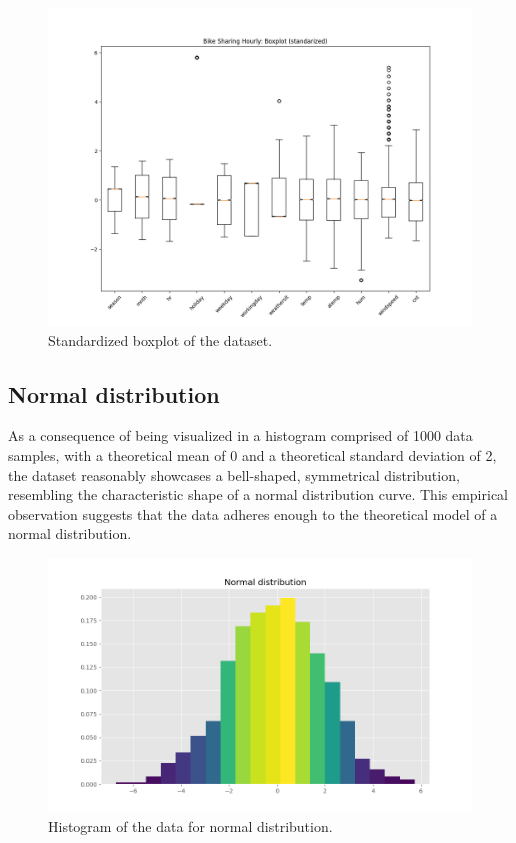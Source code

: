 \documentclass[11pt,a4paper]{article}
\begin{document}
\begin{figure}[H]
    \centering
    \includegraphics[width=1.0\linewidth]{res/plots/boxplot_standardized.png}
    \caption{Standardized boxplot of the dataset.}
    \label{fig:boxplot}
\end{figure}


\subsection{Normal distribution}

As a consequence of being visualized in a histogram comprised of 1000 data samples, with a theoretical mean of 0 and a theoretical standard deviation of 2, the dataset reasonably showcases a bell-shaped, symmetrical distribution, resembling the characteristic shape of a normal distribution curve. This empirical observation suggests that the data adheres enough to the theoretical model of a normal distribution.

\begin{figure}[H]
    \centering
    \includegraphics[width=0.6\linewidth]{res/plots/normal_distribution.png}
    \caption{Histogram of the data for normal distribution.}
    \label{fig:normal}
\end{figure}
\end{document}
